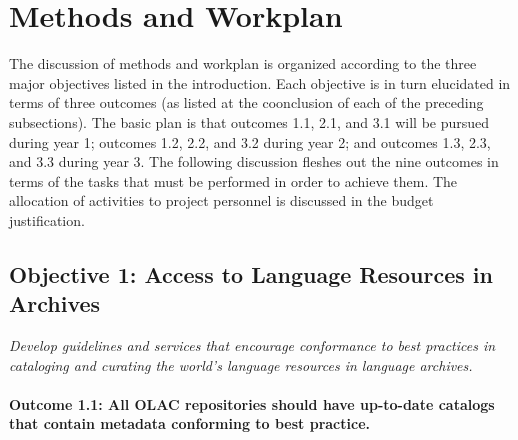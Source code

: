 \section{Methods and Workplan}

The discussion of methods and workplan is organized according to
the three major objectives listed in the introduction.
Each objective is in turn elucidated in terms of three outcomes
(as listed at the coonclusion of each of the preceding subsections).
The basic plan is that outcomes 1.1, 2.1, and 3.1 will be pursued
during year 1; outcomes 1.2, 2.2, and 3.2 during year 2;
and outcomes 1.3, 2.3, and 3.3 during year 3.
The following discussion fleshes out the nine outcomes in terms of the
tasks that must be performed in order to achieve them. The allocation of activities to project
personnel is discussed in the budget justification.


\subsection*{Objective 1: Access to Language Resources in Archives}

\emph{Develop guidelines and services that encourage conformance to best
practices in cataloging and curating the world's language resources
in language archives.}

\def\task{1.1}
\paragraph{Outcome {\task}: All OLAC repositories should have up-to-date catalogs
      that contain metadata conforming to best practice.}


